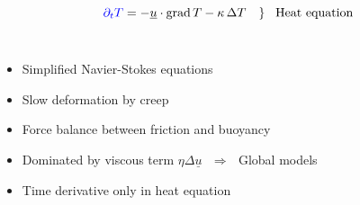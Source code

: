 \documentclass[t,compress=false,usepdftitle=false]{beamer}
\renewcommand{\vec}[1]{\underline{#1}}
\newcommand{\dt}{\partial_t}
\begin{document}
\begin{frame}
{\begin{myColorBox}{.8}{}
\begin{equation*}
\end{equation*}
\begin{equation*}
\left. {\color{blue}\dt T} = - \vec{u} \cdot \grad{T} - \kappa\, \Delta T \quad\right \} \,\,\,\,\mbox{Heat equation}
\end{equation*}\\
\end{myColorBox}
\vspace*{2ex}
\begin{itemize}
 \item Simplified Navier-Stokes equations
 \item Slow deformation by creep
 \item Force balance between friction and buoyancy
 \item Dominated by viscous term ${\eta \Delta \vec{u}}$ \,\,$\Rightarrow$\,\, Global models
 \item {\color{blue}Time derivative only in heat equation}
\end{itemize}
}
\end{frame}
\end{document}
